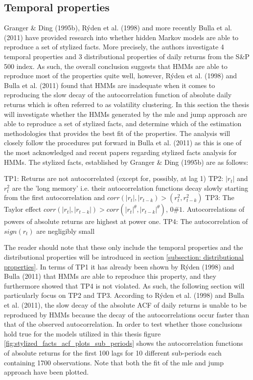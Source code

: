 \subsection{Temporal properties}
\label{Sec: Temporal properties}
Granger \& Ding (1995b), Rýden et al. (1998) and more recently Bulla et al. (2011) have provided research into whether hidden Markov models are able to reproduce a set of stylized facts. More precisely, the authors investigate 4 temporal properties and 3 distributional properties of daily returns from the S\&P 500 index. As such, the overall conclusion suggests that HMMs are able to reproduce most of the properties quite well, however, Rýden et al. (1998) and Bulla et al. (2011) found that HMMs are inadequate when it comes to reproducing the slow decay of the autocorrelation function of absolute daily returns which is often referred to as volatility clustering. In this section the thesis will investigate whether the HMMs generated by the mle and jump approach are able to reproduce a set of stylized facts, and determine which of the estimation methodologies that provides the best fit of the properties. The analysis will closely follow the procedures put forward in Bulla et al. (2011) as this is one of the most acknowledged and recent papers regarding stylized facts analysis for HMMs. The stylized facts, established by Granger \& Ding (1995b) are as follows: 

TP1: Returns are not autocorrelated (except for, possibly, at lag 1) \newline
TP2: $|r_t|$ and $r_t^2$ are the 'long memory' i.e. their autocorrelation functions decay slowly starting from the first autocorrelation and $corr(|r_t|, |r_{t-k}) > (r_t^2, r^2_{t-k})$ \newline
TP3: The Taylor effect $corr(|r_t|, |r_{t-k}|) > corr(|r_t|^{\theta}, |r_{t-k}|^{\theta})$, $0 \# 1$. Autocorrelations of powers of absolute returns are highest at power one. \newline
TP4: The autocorrelation of $sign(r_t)$ are negligibly small

The reader should note that these only include the temporal properties and the distributional properties will be introduced in section \ref{subsection: distributional properties}. In terms of TP1 it has already been shown by Rýden (1998) and Bulla (2011) that HMMs are able to reproduce this property, and they furthermore showed that TP4 is not violated. As such, the following section will particularly focus on TP2 and TP3. According to Rýden et al. (1998) and Bulla et al. (2011), the slow decay of the absolute ACF of daily returns is unable to be reproduced by HMMs because the decay of the autocorrelations occur faster than that of the observed autocorrelation. In order to test whether those conclusions hold true for the models utilized in this thesis figure \ref{fig:stylized_facts_acf_plots_sub_periods} shows the autocorrelation functions of absolute returns for the first 100 lags for 10 different sub-periods each containing 1700 observations. Note that both the fit of the mle and jump approach have been plotted.   

